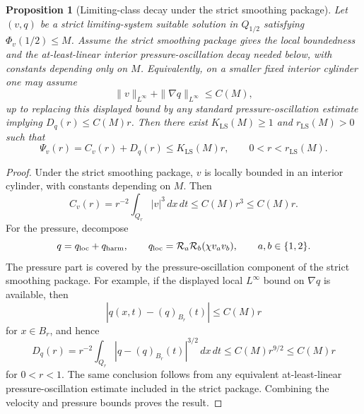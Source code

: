 \documentclass[11pt]{article}
\numberwithin{equation}{section}
\theoremstyle{plain}
\newtheorem{proposition}{Proposition}[section]
\theoremstyle{definition}
\theoremstyle{remark}
\newcommand{\LS}{\mathrm{LS}}
\newcommand{\calR}{\mathcal R}
\begin{document}
\begin{proposition}[Limiting-class decay under the strict smoothing package]\label{pI:prop:limiting-class-decay}
Let \((v,q)\) be a strict limiting-system suitable solution in \(Q_{1/2}\) satisfying \(\Phi_v(1/2)\le M\).  Assume the strict smoothing package gives the local boundedness and the at-least-linear interior pressure-oscillation decay needed below, with constants depending only on \(M\).  Equivalently, on a smaller fixed interior cylinder one may assume
\[
        \|v\|_{L^\infty}+\|\nabla q\|_{L^\infty}\le C(M),
\]
up to replacing this displayed bound by any standard pressure-oscillation estimate implying \(D_q(r)\le C(M)r\).  Then there exist \(K_{\LS}(M)\ge1\) and \(r_{\LS}(M)>0\) such that
\[
        \Psi_v(r)=C_v(r)+D_q(r)
        \le K_{\LS}(M)r,
        \qquad
        0<r<r_{\LS}(M).
\]
\end{proposition}

\begin{proof}
Under the strict smoothing package, \(v\) is locally bounded in an interior cylinder, with constants depending on \(M\).  Then
\[
        C_v(r)=r^{-2}\int_{Q_r}|v|^3\,dx\,dt\le C(M)r^3\le C(M)r.
\]
For the pressure, decompose
\[
        q=q_{\rm loc}+q_{\rm harm},
        \qquad
        q_{\rm loc}=\calR_a\calR_b(\chi v_av_b),
        \qquad a,b\in\{1,2\}.
\]
The pressure part is covered by the pressure-oscillation component of the strict smoothing package.  For example, if the displayed local \(L^\infty\) bound on \(\nabla q\) is available, then
\[
        |q(x,t)-(q)_{B_r}(t)|\le C(M)r
\]
for \(x\in B_r\), and hence
\[
        D_q(r)
        =r^{-2}\int_{Q_r}|q-(q)_{B_r}(t)|^{3/2}\,dx\,dt
        \le C(M)r^{9/2}
        \le C(M)r
\]
for \(0<r<1\).  The same conclusion follows from any equivalent at-least-linear pressure-oscillation estimate included in the strict package.  Combining the velocity and pressure bounds proves the result.
\end{proof}
\end{document}
